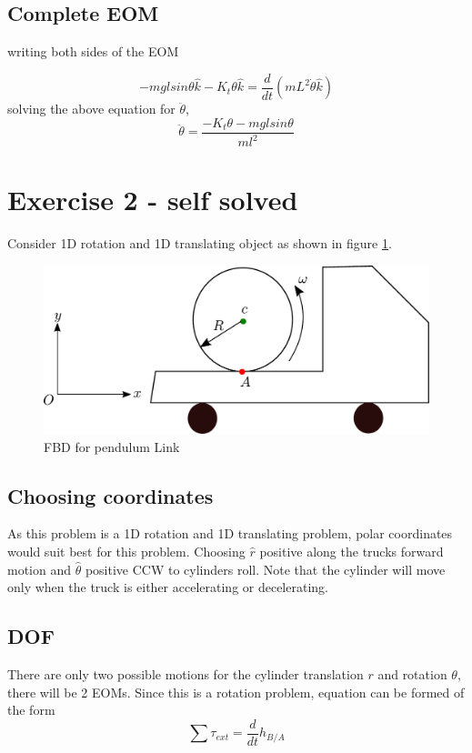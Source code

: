 \subsection{Complete EOM}

writing both sides of the EOM

\begin{equation}
	-mglsin\theta \hat{k} - K_{t}\theta \hat{k} = \frac{d}{dt}\left(m L^{2} \dot{\theta} \hat{k}\right)
\end{equation}
solving the above equation for $\ddot{\theta}$,
\begin{equation}
	\ddot{\theta} = \frac{-K_{t}\theta - mglsin\theta}{m l^{2}}
\end{equation}

\section{Exercise 2 - self solved}

Consider 1D rotation and 1D translating object as shown in figure \ref{fig_0_ch_4_Ex2}.
\begin{figure}[h!]
	\centering
	\includegraphics[width=0.5\linewidth]{Bilder/18_TruckNRollProblem.pdf}
	\caption{FBD for pendulum Link}
	\label{fig_0_ch_4_Ex2}
\end{figure}

\subsection{Choosing coordinates}

As this problem is a 1D rotation and 1D translating problem, polar coordinates would suit best for this problem. Choosing $\hat{r}$ positive along the trucks forward motion and $\hat{\theta}$ positive CCW to cylinders roll. Note that the cylinder will move only when the truck is either accelerating or decelerating.

\subsection{DOF}

There are only two possible motions for the cylinder translation $r$ and rotation $\theta$, there will be 2 EOMs. Since this is a rotation problem, equation can be formed of the form
\begin{equation}
\sum \tau_{ext} = \frac{d}{dt}h_{B/A}
\end{equation}

